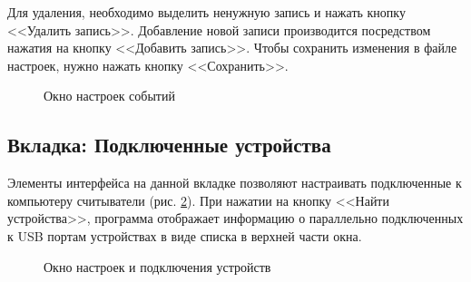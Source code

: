 Для удаления, необходимо выделить ненужную 
запись и нажать кнопку <<Удалить запись>>. Добавление новой записи производится посредством нажатия на
кнопку <<Добавить запись>>. 
Чтобы сохранить изменения в файле настроек, нужно нажать кнопку <<Сохранить>>.

\begin{figure}[h]
    \caption{Окно настроек событий}
    \label{i:sevent}
\end{figure}

\subsection{Вкладка: Подключенные устройства}

Элементы интерфейса на данной вкладке позволяют настраивать подключенные к компьютеру считыватели (рис. \ref{i:sdev}).
При нажатии на кнопку <<Найти устройства>>, программа отображает информацию о параллельно подключенных к USB портам устройствах в
виде списка в верхней части окна. 

\begin{figure}[h]
    \caption{Окно настроек и подключения устройств}
    \label{i:sdev}
\end{figure}

